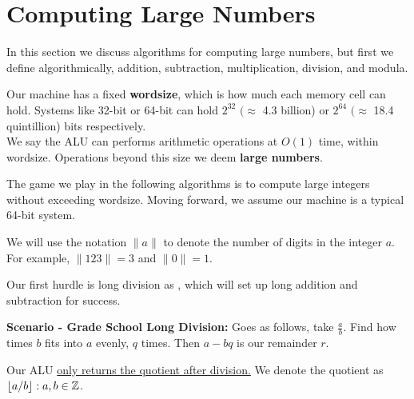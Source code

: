 \section{Computing Large Numbers}
\noindent
In this section we discuss algorithms for computing large numbers, but first we define 
algorithmically, addition, subtraction, multiplication, division, and modula.

\begin{Def}[Wordsize]

    Our machine has a fixed \textbf{wordsize}, which is how much each memory cell can hold. Systems like 32-bit or 64-bit can hold $2^{32}$ $(\approx$ 4.3 billion) or $2^{64}$ $(\approx$ 18.4 quintillion) bits respectively.\\

    \noindent
    We say the ALU can performs arithmetic operations at $O(1)$ time, within wordsize. Operations beyond this size we deem \textbf{large numbers}.
\end{Def}
\noindent
The game we play in the following algorithms is to compute large integers without exceeding wordsize. Moving forward, we assume our machine is a typical 64-bit system.
\begin{Func}

    We will use the notation $\|a\|$ to denote the number of digits in the integer $a$. For example, $\|123\| = 3$ and $\|0\| = 1$.
\end{Func}

\noindent
\noindent
Our first hurdle is long division as , which will set up long addition and subtraction for success.

\noindent
\textbf{Scenario - Grade School Long Division:} Goes as follows, take $\frac{a}{b}$. Find how times $b$ fits into $a$ evenly, $q$ times. Then $a-bq$ is our remainder $r$.
\begin{Def}

    Our ALU  \underline{only returns the quotient after division.} We denote the quotient as $\floor*{a/b}:a,b\in\Z$.
\end{Def}

